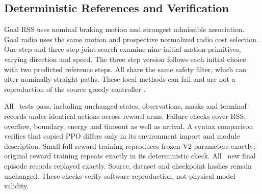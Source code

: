 \subsection{Deterministic References and Verification}
Goal RSS uses nominal braking motion and strongest admissible association.
Goal radio uses the same motion and prospective normalized radio cost selection.
One step and three step joint search examine nine initial motion primitives,
varying direction and speed. The three step version follows each initial
choice with two predicted reference steps. All share the same safety filter,
which can alter nominally straight paths. These local methods can fail and
are not a reproduction of the source greedy controller
\cite[pp.~13--14, Sec.~5.4]{thesis}.

All \TestCount\ tests pass, including unchanged states, observations, masks
and terminal records under identical actions across reward arms. Failure checks
cover RSS, overflow, boundary, energy and timeout as well as arrival. A syntax
comparison verifies that copied PPO differs only in its environment import
and module description. Small full reward training reproduces frozen V2
parameters exactly; original reward training repeats exactly in its deterministic
check. All \ReplayCount\ new final episode records replayed exactly. Source,
dataset and checkpoint hashes remain unchanged. These checks verify software
reproduction, not physical model validity.
